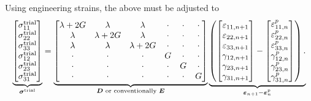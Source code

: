 Using engineering strains, the above must be adjusted to
\begin{gather}
    \underbrace{
        \begin{bmatrix}
            \sigma^\text{trial}_{11} \\
            \sigma^\text{trial}_{22} \\
            \sigma^\text{trial}_{33} \\
            \sigma^\text{trial}_{12} \\
            \sigma^\text{trial}_{23} \\
            \sigma^\text{trial}_{31}
        \end{bmatrix}}_{\bm{\sigma}^\text{trial}}
    =
    \underbrace{\begin{bmatrix}
            \lambda+2G & \lambda    & \lambda    & \cdot & \cdot & \cdot \\
            \lambda    & \lambda+2G & \lambda    & \cdot & \cdot & \cdot \\
            \lambda    & \lambda    & \lambda+2G & \cdot & \cdot & \cdot \\
            \cdot      & \cdot      & \cdot      & G     & \cdot & \cdot \\
            \cdot      & \cdot      & \cdot      & \cdot & G     & \cdot \\
            \cdot      & \cdot      & \cdot      & \cdot & \cdot & G
        \end{bmatrix}}_{\bm{D}\text{ or conventionally }\bm{E}}
    \underbrace{\left(\begin{bmatrix}
            \varepsilon_{11,n+1} \\
            \varepsilon_{22,n+1} \\
            \varepsilon_{33,n+1} \\
            \gamma_{12,n+1}      \\
            \gamma_{23,n+1}      \\
            \gamma_{31,n+1}
        \end{bmatrix}-\begin{bmatrix}
            \varepsilon^p_{11,n} \\
            \varepsilon^p_{22,n} \\
            \varepsilon^p_{33,n} \\
            \gamma^p_{12,n}      \\
            \gamma^p_{23,n}      \\
            \gamma^p_{31,n}
        \end{bmatrix}
        \right).}_{\bm{\varepsilon}_{n+1}-\bm{\varepsilon}^p_n}
\end{gather}

